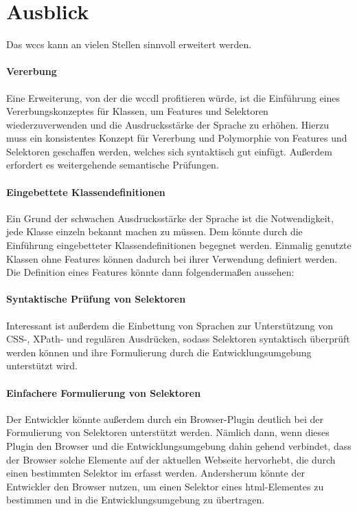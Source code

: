 \section{Ausblick}
    \label{section:endingOutlook}
    Das \gls{wccs} kann an vielen Stellen sinnvoll erweitert werden.

    \paragraph*{Vererbung}
    Eine Erweiterung, von der die \gls{wccdl} profitieren würde,
    ist die Einführung eines Vererbungskonzeptes für Klassen,
    um Features und Selektoren wiederzuverwenden und die Ausdrucksstärke
    der Sprache zu erhöhen.
    Hierzu muss ein konsistentes Konzept für Vererbung und Polymorphie
    von Features und Selektoren geschaffen werden,
    welches sich syntaktisch gut einfügt.
    Außerdem erfordert es weitergehende semantische Prüfungen.

    \paragraph*{Eingebettete Klassendefinitionen}
    Ein Grund der schwachen Ausdrucksstärke der Sprache ist die Notwendigkeit,
    jede Klasse einzeln bekannt machen zu müssen.
    Dem könnte durch die Einführung eingebetteter Klassendefinitionen begegnet werden.
    Einmalig genutzte Klassen ohne Features können dadurch bei ihrer Verwendung
    definiert werden.
    Die Definition eines Features könnte dann folgendermaßen aussehen:

    

    \paragraph*{Syntaktische Prüfung von Selektoren}
    Interessant ist außerdem die Einbettung
    von Sprachen zur Unterstützung von CSS-, XPath- und regulären Ausdrücken,
    sodass Selektoren syntaktisch überprüft werden können
    und ihre Formulierung durch die Entwicklungsumgebung unterstützt wird.

    \paragraph*{Einfachere Formulierung von Selektoren}
    Der Entwickler könnte außerdem durch ein Browser-Plugin
    deutlich bei der Formulierung von Selektoren unterstützt werden.
    Nämlich dann, wenn dieses Plugin den Browser und die Entwicklungsumgebung
    dahin gehend verbindet, dass der Browser solche Elemente auf der aktuellen Webseite
    hervorhebt, die durch einen bestimmten Selektor im {\classificationModel} erfasst werden.
    Andersherum könnte der Entwickler den Browser nutzen,
    um einen Selektor eines \gls{html}-Elementes zu bestimmen und
    in die Entwicklungsumgebung zu übertragen.

